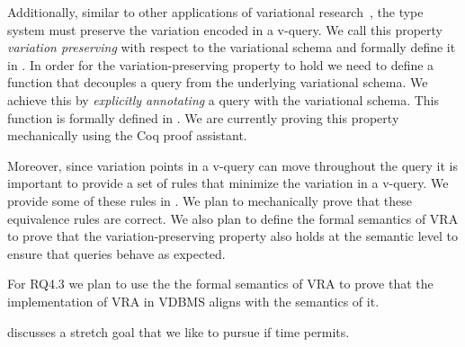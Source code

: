 Additionally, 
similar to other applications of variational research~\cite{CEW16ecoop,CEW14toplas},
the type system must preserve the variation encoded in a v-query.
We call this property \emph{variation preserving} with respect to the
variational schema and formally define it in .
%
In order for the variation-preserving property to hold we need to define 
a function that decouples a query from the underlying variational schema.
We achieve this by \emph{explicitly annotating} a query with the variational
schema. This function is formally defined in .
We are currently proving this property mechanically using the Coq
proof assistant.
%

Moreover, since variation points in a v-query can move throughout 
the query it is important to provide a set of rules that minimize
the variation in a v-query. We provide some of these rules in .
We plan to mechanically prove that these equivalence rules
are correct. 
%
We also plan to define the formal semantics of VRA to prove
that the variation-preserving property also holds at the semantic 
level to ensure that queries behave as expected.




For RQ4.3 we plan to use the the formal semantics of VRA 
to
prove that the implementation of VRA in VDBMS aligns with
the semantics of it. 

 discusses a stretch goal that we like to pursue if time permits.







